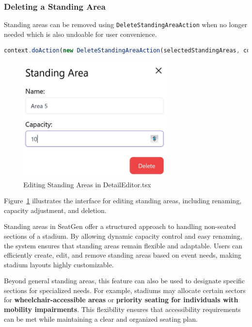 \subsubsection{Deleting a Standing Area}
Standing areas can be removed using \texttt{DeleteStandingAreaAction} when no longer needed which is also undoable for user convenience.

\begin{lstlisting}[language=TypeScript, caption=Deleting Standing Areas, label=lst:delete-standingarea]
context.doAction(new DeleteStandingAreaAction(selectedStandingAreas, context))

\end{lstlisting}

\begin{figure}[H]
    \centering
    \includegraphics[width=0.7\textwidth]{pics/DetailEditorStandingArea.png}
    \caption{Editing Standing Areas in DetailEditor.tsx}
    \label{fig:detail-editor-standingarea}
\end{figure}

Figure~\ref{fig:detail-editor-standingarea} illustrates the interface for editing standing areas, including renaming, capacity adjustment, and deletion.

Standing areas in SeatGen offer a structured approach to handling non-seated sections of a stadium. By allowing dynamic capacity control and easy renaming, the system ensures that standing areas remain flexible and adaptable. Users can efficiently create, edit, and remove standing areas based on event needs, making stadium layouts highly customizable.

Beyond general standing areas, this feature can also be used to designate specific sections for specialized needs. For example, stadiums may allocate certain sectors for \textbf{wheelchair-accessible areas} or \textbf{priority seating for individuals with mobility impairments}. This flexibility ensures that accessibility requirements can be met while maintaining a clear and organized seating plan.


